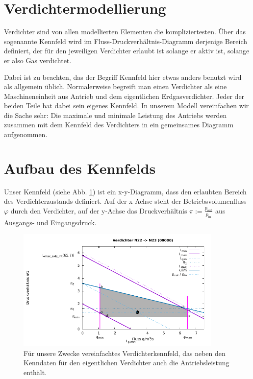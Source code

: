 \documentclass{article}
\begin{document}
\section*{Verdichtermodellierung}

Verdichter sind von allen modellierten Elementen die kompliziertesten. Über das sogenannte Kennfeld wird im Fluss-Druckverhältnis-Diagramm derjenige Bereich definiert, der für den jeweiligen Verdichter erlaubt ist solange er aktiv ist, solange er also Gas verdichtet.

Dabei ist zu beachten, das der Begriff Kennfeld hier etwas anders benutzt wird als allgemein üblich. Normalerweise begreift man einen Verdichter als eine Maschineneinheit aus Antrieb und dem eigentlichen Erdgasverdichter. Jeder der beiden Teile hat dabei sein eigenes Kennfeld. In unserem Modell vereinfachen wir die Sache sehr: Die maximale und minimale Leistung des Antriebs werden zusammen mit dem Kennfeld des Verdichters in ein gemeinsames Diagramm aufgenommen.

\section{Aufbau des Kennfelds}
Unser Kennfeld (siehe Abb. \ref{fig:kf}) ist ein x-y-Diagramm, dass den erlaubten Bereich des Verdichterzustands definiert. Auf der x-Achse steht der Betriebsvolumenfluss $\varphi$ durch den Verdichter, auf der y-Achse das Druckverhältnis $\pi:=\frac{p_{\text{out}}}{p_{\text{in}}}$ aus Ausgangs- und Eingangsdruck.



\begin{figure}[!ht]
\includegraphics[width=0.9\textwidth]{Example_Compressor_Wheel_Map.pdf}
\caption{Für unsere Zwecke vereinfachtes Verdichterkennfeld, das neben den Kenndaten für den eigentlichen Verdichter auch die Antriebsleistung enthält.}
\label{fig:kf}
\end{figure}
\end{document}
